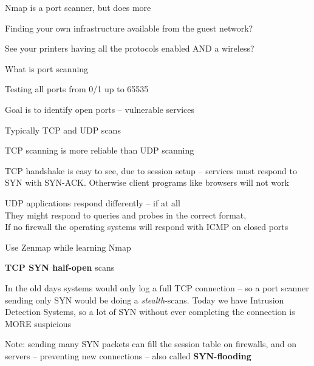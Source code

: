 \documentclass[Screen16to9,17pt]{foils}
\begin{document}


\begin{list2}
\item Nmap is a port scanner, but does more
\item Finding your own infrastructure available from the guest network?
\item See your printers having all the protocols enabled AND a wireless?
\end{list2}


\begin{list1}
\item What is port scanning
\item Testing all ports from 0/1 up to 65535
\item Goal is to identify open ports -- vulnerable services
\item Typically TCP and UDP scans
\item TCP scanning is more reliable than UDP scanning
\item TCP handshake is easy to see, due to session setup -- services must respond to SYN with SYN-ACK. Otherwise client programs like browsers will not work
\item UDP applications respond differently -- if at all\\
They might respond to queries and probes in the correct format, \\
If no firewall the operating systems will respond with ICMP on closed ports
\item Use Zenmap while learning Nmap
\end{list1}



\begin{list2}
\item {\bfseries TCP SYN half-open} scans
\item In the old days systems would only log a full TCP connection
  -- so a port scanner sending only SYN would be doing a \emph{stealth}-scans. Today we have Intrusion Detection Systems, so a lot of SYN without ever completing the connection is MORE suspicious
\item Note: sending many SYN packets can fill the session table on firewalls, and on servers -- preventing new connections -- also called {\bfseries SYN-flooding}
\end{list2}
\end{document}
